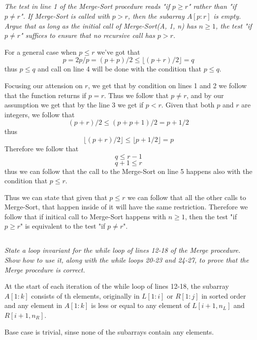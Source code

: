 \documentclass[11pt,oneside,titlepage]{book}
\begin{document}
\subsection{}

\textit{The test in line 1 of the Merge-Sort procedure reads "if $p \geq r$" rather than
  "if $p \neq r$". If Merge-Sort is called with $p > r$, then the subarray $A[p:r]$ is
  empty. Argue that as long as the initial call of Merge-Sort(A, 1, n) has $n \geq 1$, the
  test "if $p \neq r$" suffices to ensure that no recursive call has $p > r$.}

For a general case when $p \leq r$ we've got that
$$p = 2p/p = (p + p)/2 \leq \lfloor(p + r)/2\rfloor = q$$
thus $p \leq q$ and call on line 4 will be done with the condition that $p \leq q$.

Focusing our attension on $r$, we get that by condition on lines 1 and 2 we follow that
the function returns if $p = r$. Thus we follow that $p \neq r$, and by our assumption
we get that by the line 3 we get if $p < r$. Given that both  $p$ and $r$ are integers,
we follow that
$$(p + r)/2 \leq (p + p + 1)/2  = p + 1/2$$
thus
$$\lfloor(p + r)/2\rfloor \leq  \lfloor p + 1/2 \rfloor = p$$
Therefore we follow that
$$q \leq r - 1$$
$$q + 1\leq r$$
thus we can follow that the call to the Merge-Sort on line 5 happens also with the condition
that $p \leq r$.

Thus we can state that given that $p \leq r$ we can follow that all the other calls
to Merge-Sort, that happen inside of it  will have the same restriction.
Therefore we follow that if initical call to Merge-Sort happens with $n \geq 1$, then the test
"if $p \geq r$" is equivalent to the test "if $p \neq r$".

\subsection{}

\textit{State a loop invariant for the while loop of lines 12-18 of the Merge procedure. Show
  how to use it, along with the while loops 20-23 and 24-27, to prove that the Merge procedure
  is correct.}

At the start of each iteration of the while loop of lines 12-18, the subarray $A[1:k]$ consists
of th elements, originally in $L[1:i]$ or $R[1:j]$ in sorted order and any element
in $A[1:k]$ is less or equal to any element of $L[i + 1, n_L]$ and $R[i + 1, n_R]$.

Base case is trivial, sinse none of the subarrays contain any elements.
\end{document}
